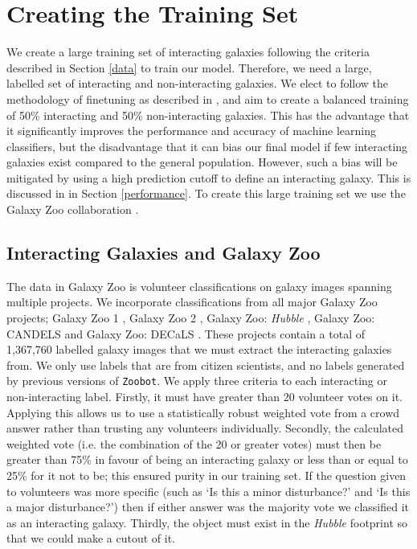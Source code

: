 \section{Creating the Training Set}\label{training}
\noindent We create a large training set of interacting galaxies following the criteria described in Section \ref{data} to train our model. Therefore, we need a large, labelled set of interacting and non-interacting galaxies. We elect to follow the methodology of finetuning as described in \citet{2022MNRAS.513.1581W}, and aim to create a balanced training of 50\% interacting and 50\% non-interacting galaxies. This has the advantage that it significantly improves the performance and accuracy of machine learning classifiers, but the disadvantage that it can bias our final model if few interacting galaxies exist compared to the general population. However, such a bias will be mitigated by using a high prediction cutoff to define an interacting galaxy. This is discussed in in Section \ref{performance}. To create this large training set we use the Galaxy Zoo collaboration \citep[initial data release described in][]{2008MNRAS.389.1179L}.

\subsection{Interacting Galaxies and Galaxy Zoo}
\noindent The data in Galaxy Zoo is volunteer classifications on galaxy images spanning multiple projects. We incorporate classifications from all major Galaxy Zoo projects; Galaxy Zoo 1 \citep{2008MNRAS.389.1179L}, Galaxy Zoo 2 \citep{2013MNRAS.435.2835W}, Galaxy Zoo: \emph{Hubble} \citep{2017MNRAS.464.4176W}, Galaxy Zoo: CANDELS \citep{2017MNRAS.464.4420S} and Galaxy Zoo: DECaLS \citep{2022MNRAS.509.3966W}. These projects contain a total of 1,367,760 labelled galaxy images that we must extract the interacting galaxies from. We only use labels that are from citizen scientists, and no labels generated by previous versions of \texttt{Zoobot}. We apply three criteria to each interacting or non-interacting label. Firstly, it must have greater than 20 volunteer votes on it. Applying this allows us to use a statistically robust weighted vote from a crowd answer rather than trusting any volunteers individually. Secondly, the calculated weighted vote (i.e. the combination of the 20 or greater votes) must then be greater than 75\% in favour of being an interacting galaxy or less than or equal to 25\% for it not to be; this ensured purity in our training set. If the question given to volunteers was more specific (such as `Is this a minor disturbance?' and `Is this a major disturbance?') then if either answer was the majority vote we classified it as an interacting galaxy. Thirdly, the object must exist in the \emph{Hubble} footprint so that we could make a cutout of it.

